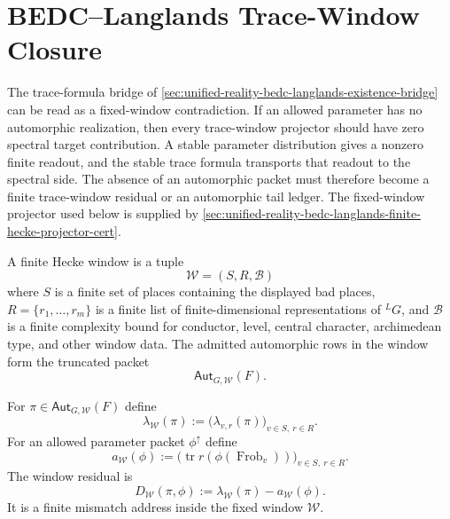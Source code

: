 \section{BEDC--Langlands Trace-Window Closure}
\label{sec:unified-reality-bedc-langlands-trace-window-closure}

The trace-formula bridge of
\autoref{sec:unified-reality-bedc-langlands-existence-bridge} can be
read as a fixed-window contradiction. If an allowed parameter has no
automorphic realization, then every trace-window projector should have
zero spectral target contribution. A stable parameter distribution gives
a nonzero finite readout, and the stable trace formula transports that
readout to the spectral side. The absence of an automorphic packet must
therefore become a finite trace-window residual or an automorphic tail
ledger. The fixed-window projector used below is supplied by
\autoref{sec:unified-reality-bedc-langlands-finite-hecke-projector-cert}.

\begin{definition}
\label{def:unified-reality-finite-hecke-window}
A finite Hecke window is a tuple
$$
\mathcal W=(S,R,\mathcal B)
$$
where $S$ is a finite set of places containing the displayed bad places,
$R=\{r_1,\ldots,r_m\}$ is a finite list of finite-dimensional
representations of ${}^LG$, and $\mathcal B$ is a finite complexity
bound for conductor, level, central character, archimedean type, and
other window data. The admitted automorphic rows in the window form the
truncated packet
$$
\mathsf{Aut}_{G,\mathcal W}(F).
$$
\end{definition}

\begin{definition}
\label{def:unified-reality-window-readout-residual}
For $\pi\in\mathsf{Aut}_{G,\mathcal W}(F)$ define
$$
\lambda_{\mathcal W}(\pi)
:=
\bigl(\lambda_{v,r}(\pi)\bigr)_{v\in S,\ r\in R}.
$$
For an allowed parameter packet $\phi^{\uparrow}$ define
$$
a_{\mathcal W}(\phi)
:=
\bigl(\operatorname{tr}r(\phi(\operatorname{Frob}_v))\bigr)_{v\in S,\ r\in R}.
$$
The window residual is
$$
D_{\mathcal W}(\pi,\phi)
:=
\lambda_{\mathcal W}(\pi)-a_{\mathcal W}(\phi).
$$
It is a finite mismatch address inside the fixed window $\mathcal W$.
\end{definition}

